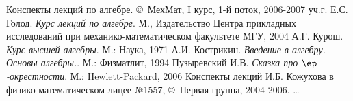  \begin{thebibliography}{books}
    Конспекты лекций по алгебре. \copyright\, МехМат, I курс, 1-й поток, 2006-2007 уч.г.
    Е.С. Голод. \emph{Курс лекций по алгебре}. М., Издательство Центра прикладных исследований при механико-математическом факультете МГУ, 2004
    А.Г. Курош. \emph{Курс высшей алгебры}. М.: Наука, 1971
    А.И. Кострикин. \emph{Введение в алгебру. Основы алгебры.}. М.: Физматлит, 1994
    Пузыревский И.В. \emph{Сказка про $\ep$-окрестности}. М.: Hewlett-Packard, 2006
    Конспекты лекций И.Б. Кожухова в физико-математическом лицее №1557, \copyright\, Первая группа, 2004-2006.
   \dots
 \end{thebibliography}
